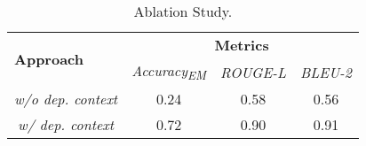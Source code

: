 \begin{table}[]
\centering
\begin{tabular}{l|ccc}
\toprule
\multirow{2}{*}{\textbf{Approach}} & \multicolumn{3}{c}{\textbf{Metrics}}                                  \\ \cline{2-4} 
                                   & \multicolumn{1}{c|}{\textit{Accuracy\textsubscript{EM}}} & \multicolumn{1}{c|}{\textit{ROUGE-L}} & \textit{BLEU-2} \\ \hline
\multicolumn{1}{c|}{\textit{w/o dep. context}}      & \multicolumn{1}{c|}{0.24}         & \multicolumn{1}{c|}{0.58}        &  0.56 \\
\multicolumn{1}{c|}{\textit{w/ dep. context}}       & \multicolumn{1}{c|}{0.72}         & \multicolumn{1}{c|}{0.90}        &  0.91 \\ \bottomrule
\end{tabular}
\caption{Ablation Study.}
\end{table}